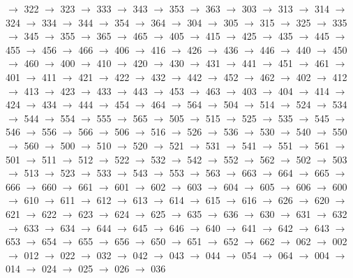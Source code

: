 $\rightarrow$ 322 $\rightarrow$ 323 $\rightarrow$ 333 $\rightarrow$ 343 $\rightarrow$ 353 $\rightarrow$ 363 $\rightarrow$ 303 $\rightarrow$ 313 $\rightarrow$ 314 $\rightarrow$ 324 $\rightarrow$ 334 $\rightarrow$ 344 $\rightarrow$ 354 $\rightarrow$ 364 $\rightarrow$ 304 $\rightarrow$ 305 $\rightarrow$ 315 $\rightarrow$ 325 $\rightarrow$ 335 $\rightarrow$ 345 $\rightarrow$ 355 $\rightarrow$ 365 $\rightarrow$ 465 $\rightarrow$ 405 $\rightarrow$ 415 $\rightarrow$ 425 $\rightarrow$ 435 $\rightarrow$ 445 $\rightarrow$ 455 $\rightarrow$ 456 $\rightarrow$ 466 $\rightarrow$ 406 $\rightarrow$ 416 $\rightarrow$ 426 $\rightarrow$ 436 $\rightarrow$ 446 $\rightarrow$ 440 $\rightarrow$ 450 $\rightarrow$ 460 $\rightarrow$ 400 $\rightarrow$ 410 $\rightarrow$ 420 $\rightarrow$ 430 $\rightarrow$ 431 $\rightarrow$ 441 $\rightarrow$ 451 $\rightarrow$ 461 $\rightarrow$ 401 $\rightarrow$ 411 $\rightarrow$ 421 $\rightarrow$ 422 $\rightarrow$ 432 $\rightarrow$ 442 $\rightarrow$ 452 $\rightarrow$ 462 $\rightarrow$ 402 $\rightarrow$ 412 $\rightarrow$ 413 $\rightarrow$ 423 $\rightarrow$ 433 $\rightarrow$ 443 $\rightarrow$ 453 $\rightarrow$ 463 $\rightarrow$ 403 $\rightarrow$ 404 $\rightarrow$ 414 $\rightarrow$ 424 $\rightarrow$ 434 $\rightarrow$ 444 $\rightarrow$ 454 $\rightarrow$ 464 $\rightarrow$ 564 $\rightarrow$ 504 $\rightarrow$ 514 $\rightarrow$ 524 $\rightarrow$ 534 $\rightarrow$ 544 $\rightarrow$ 554 $\rightarrow$ 555 $\rightarrow$ 565 $\rightarrow$ 505 $\rightarrow$ 515 $\rightarrow$ 525 $\rightarrow$ 535 $\rightarrow$ 545 $\rightarrow$ 546 $\rightarrow$ 556 $\rightarrow$ 566 $\rightarrow$ 506 $\rightarrow$ 516 $\rightarrow$ 526 $\rightarrow$ 536 $\rightarrow$ 530 $\rightarrow$ 540 $\rightarrow$ 550 $\rightarrow$ 560 $\rightarrow$ 500 $\rightarrow$ 510 $\rightarrow$ 520 $\rightarrow$ 521 $\rightarrow$ 531 $\rightarrow$ 541 $\rightarrow$ 551 $\rightarrow$ 561 $\rightarrow$ 501 $\rightarrow$ 511 $\rightarrow$ 512 $\rightarrow$ 522 $\rightarrow$ 532 $\rightarrow$ 542 $\rightarrow$ 552 $\rightarrow$ 562 $\rightarrow$ 502 $\rightarrow$ 503 $\rightarrow$ 513 $\rightarrow$ 523 $\rightarrow$ 533 $\rightarrow$ 543 $\rightarrow$ 553 $\rightarrow$ 563 $\rightarrow$ 663 $\rightarrow$ 664 $\rightarrow$ 665 $\rightarrow$ 666 $\rightarrow$ 660 $\rightarrow$ 661 $\rightarrow$ 601 $\rightarrow$ 602 $\rightarrow$ 603 $\rightarrow$ 604 $\rightarrow$ 605 $\rightarrow$ 606 $\rightarrow$ 600 $\rightarrow$ 610 $\rightarrow$ 611 $\rightarrow$ 612 $\rightarrow$ 613 $\rightarrow$ 614 $\rightarrow$ 615 $\rightarrow$ 616 $\rightarrow$ 626 $\rightarrow$ 620 $\rightarrow$ 621 $\rightarrow$ 622 $\rightarrow$ 623 $\rightarrow$ 624 $\rightarrow$ 625 $\rightarrow$ 635 $\rightarrow$ 636 $\rightarrow$ 630 $\rightarrow$ 631 $\rightarrow$ 632 $\rightarrow$ 633 $\rightarrow$ 634 $\rightarrow$ 644 $\rightarrow$ 645 $\rightarrow$ 646 $\rightarrow$ 640 $\rightarrow$ 641 $\rightarrow$ 642 $\rightarrow$ 643 $\rightarrow$ 653 $\rightarrow$ 654 $\rightarrow$ 655 $\rightarrow$ 656 $\rightarrow$ 650 $\rightarrow$ 651 $\rightarrow$ 652 $\rightarrow$ 662 $\rightarrow$ 062 $\rightarrow$ 002 $\rightarrow$ 012 $\rightarrow$ 022 $\rightarrow$ 032 $\rightarrow$ 042 $\rightarrow$ 043 $\rightarrow$ 044 $\rightarrow$ 054 $\rightarrow$ 064 $\rightarrow$ 004 $\rightarrow$ 014 $\rightarrow$ 024 $\rightarrow$ 025 $\rightarrow$ 026 $\rightarrow$ 036 